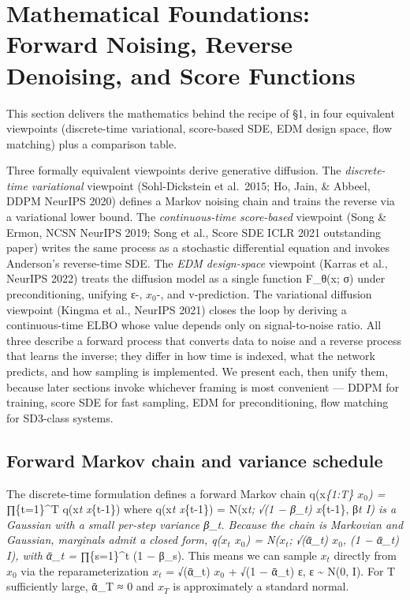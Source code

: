 \section{Mathematical Foundations: Forward Noising, Reverse Denoising, and Score Functions}\label{mathematical-foundations-forward-noising-reverse-denoising-and-score-functions}

This section delivers the mathematics behind the recipe of §1, in four equivalent viewpoints (discrete-time variational, score-based SDE, EDM design space, flow matching) plus a comparison table.

Three formally equivalent viewpoints derive generative diffusion. The \emph{discrete-time variational} viewpoint (Sohl-Dickstein et al.~2015; Ho, Jain, \& Abbeel, DDPM NeurIPS 2020) defines a Markov noising chain and trains the reverse via a variational lower bound. The \emph{continuous-time score-based} viewpoint (Song \& Ermon, NCSN NeurIPS 2019; Song et al., Score SDE ICLR 2021 outstanding paper) writes the same process as a stochastic differential equation and invokes Anderson's reverse-time SDE. The \emph{EDM design-space} viewpoint (Karras et al., NeurIPS 2022) treats the diffusion model as a single function F\_θ(x; σ) under preconditioning, unifying ε-, \(x_0\)-, and v-prediction. The variational diffusion viewpoint (Kingma et al., NeurIPS 2021) closes the loop by deriving a continuous-time ELBO whose value depends only on signal-to-noise ratio. All three describe a forward process that converts data to noise and a reverse process that learns the inverse; they differ in how time is indexed, what the network predicts, and how sampling is implemented. We present each, then unify them, because later sections invoke whichever framing is most convenient --- DDPM for training, score SDE for fast sampling, EDM for preconditioning, flow matching for SD3-class systems.

\subsection{Forward Markov chain and variance schedule}\label{forward-markov-chain-and-variance-schedule}

The discrete-time formulation defines a forward Markov chain q(x\emph{\{1:T\} \textbar{} \(x_0\)) = ∏}\{t=1\}\^{}T q(x\emph{t \textbar{} x}\{t-1\}) where q(x\emph{t \textbar{} x}\{t-1\}) = N(x\emph{t; √(1 − β\_t) x}\{t-1\}, β\emph{t I) is a Gaussian with a small per-step variance β\_t. Because the chain is Markovian and Gaussian, marginals admit a closed form, q(\(x_t\) \textbar{} \(x_0\)) = N(\(x_t\); √(ᾱ\_t) \(x_0\), (1 − ᾱ\_t) I), with ᾱ\_t = ∏}\{s=1\}\^{}t (1 − β\_s). This means we can sample \(x_t\) directly from \(x_0\) via the reparameterization \(x_t\) = √(ᾱ\_t) \(x_0\) + √(1 − ᾱ\_t) ε, ε \textasciitilde{} N(0, I). For T sufficiently large, ᾱ\_T ≈ 0 and \(x_T\) is approximately a standard normal.

